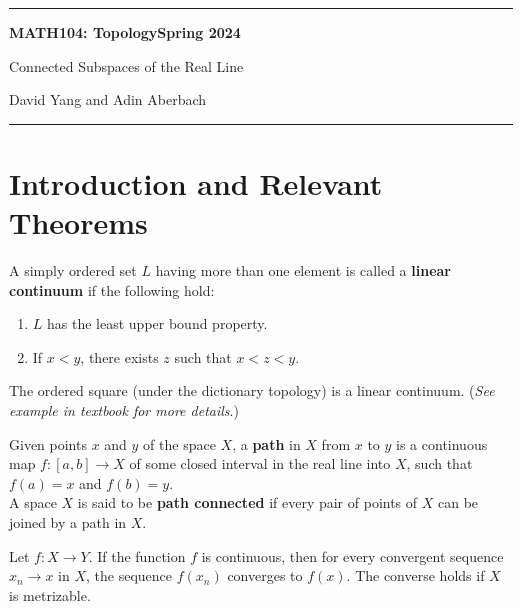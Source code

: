 \documentclass[11pt]{article}
\begin{document}
	\hrule
	\begin{center}
        \textbf{MATH104: Topology}\hfill \textbf{Spring 2024}\newline

		{\Large Connected Subspaces of the Real Line}

		David Yang and Adin Aberbach
	\end{center}

\hrule

\vspace{1em}

\section{Introduction and Relevant Theorems}

\begin{definition}
A simply ordered set $L$ having more than one element is called a
\textbf{linear continuum} if the following hold:
\begin{enumerate}
    \item $L$ has the least upper bound property.
    \item If $x < y$, there exists $z$ such that $x < z < y$.
\end{enumerate}
\end{definition}

\begin{eg}
The ordered square (under the dictionary topology) is a linear continuum. (\textit{See example in textbook for more details}.)
\end{eg}

\begin{definition}
Given points $x$ and $y$ of the space $X$, a \textbf{path} in $X$ from $x$ to $y$
is a continuous map $f\colon [a, b] \rightarrow X$ of some closed interval in the real line into $X$, such
that $f(a) = x$ and $f(b) = y$. \\

\noindent A space $X$ is said to be \textbf{path connected} if every pair of points of $X$ can be joined by a path in $X$.
\end{definition}

\begin{theorem}
Let $f\colon X\rightarrow Y$. If the function $f$ is continuous, then for every convergent sequence $x_n \rightarrow x$ in $X$, the sequence $f(x_n)$ converges to $f(x)$. 
The converse holds if $X$ is metrizable.
\end{theorem}
\end{document}
